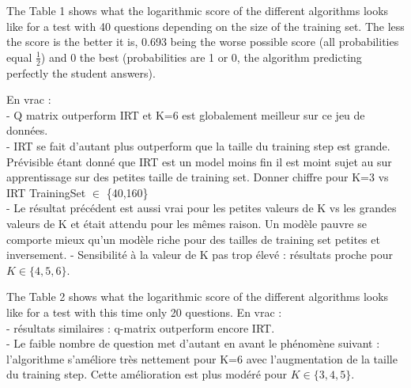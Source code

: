 \documentclass{sig-alternate}
\begin{document}
The Table 1 shows what the logarithmic score of the different algorithms looks like for a test with 40 questions depending on the size of the training set. The less the score is the better it is, 0.693 being the worse possible score (all probabilities equal $\frac{1}{2}$) and 0 the best (probabilities are 1 or 0, the algorithm predicting perfectly the student answers). 

En vrac : \\
- Q matrix outperform IRT et K=6 est globalement meilleur sur ce jeu de données. \\
- IRT se fait d'autant plus outperform que la taille du training step est grande. Prévisible étant donné que IRT est un model moins fin il est moint sujet au sur apprentissage sur des petites taille de training set. Donner chiffre pour K=3 vs IRT TrainingSet $\in$ \{40,160\}\\
- Le résultat précédent est aussi vrai pour les petites valeurs de K vs les grandes valeurs de K et était attendu pour les mêmes raison. Un modèle pauvre se comporte mieux qu'un modèle riche pour des tailles de training set petites et inversement. 
- Sensibilité à la valeur de K pas trop élevé : résultats proche pour $K \in \{4,5,6\}$. 

The Table 2 shows what the logarithmic score of the different algorithms looks like for a test with this time only 20 questions. 
En vrac : \\
- résultats similaires : q-matrix outperform encore IRT. \\
- Le faible nombre de question met d'autant en avant le phénomène suivant : l'algorithme s'améliore très nettement pour K=6 avec l'augmentation de la taille du training step. Cette amélioration est plus modéré pour $K \in \{3,4,5\}$. 
\end{document}
